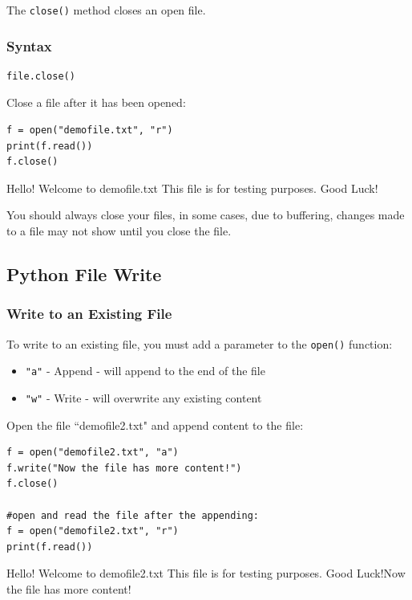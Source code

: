 \documentclass[12pt,a4paper]{article}
\newcommand{\code}[1]{%
	\colorbox{backcolour}{\lstinline{#1}}%
}
\begin{document}
The \code{close()} method closes an open file.

\subsubsection{Syntax}

\begin{lstlisting}
file.close()
\end{lstlisting}

\begin{ebox}
Close a file after it has been opened:
	\begin{lstlisting}
f = open("demofile.txt", "r")
print(f.read())
f.close()
	\end{lstlisting}
\tcblower
	\begin{vercode}
Hello! Welcome to demofile.txt
This file is for testing purposes.
Good Luck! 
	\end{vercode}
\end{ebox}

\begin{nbox}
You should always close your files, in some cases, due to buffering, changes
made to a file may not show until you close the file.
\end{nbox}
\subsection{Python File Write}

\subsubsection{Write to an Existing File}

To write to an existing file, you must add a parameter to the \code{open()} function:

\begin{itemize}
	\item \code{"a"} - Append - will append to the end of the file

	\item \code{"w"} - Write - will overwrite any existing content
\end{itemize}

\begin{ebox}
Open the file ``demofile2.txt" and append content to the file:
	\begin{lstlisting}
f = open("demofile2.txt", "a")
f.write("Now the file has more content!")
f.close()

#open and read the file after the appending:
f = open("demofile2.txt", "r")
print(f.read())
	\end{lstlisting}
\tcblower
	\begin{vercode}
Hello! Welcome to demofile2.txt
This file is for testing purposes.
Good Luck!Now the file has more content! 
	\end{vercode}
\end{ebox}
\end{document}
